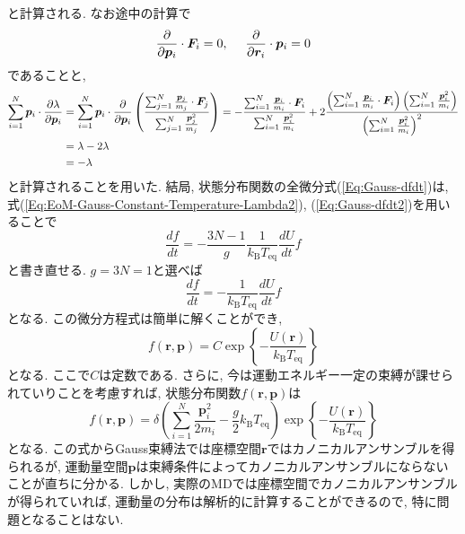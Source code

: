 と計算される. 
なお途中の計算で
\begin{align}
    \frac{\partial}{\partial \bm{p}_{i}} \cdot \bm{F}_{i} = 0,~~~~
    \frac{\partial}{\partial \bm{r}_{i}} \cdot \bm{p}_{i} = 0
    \notag 
\end{align}
であることと, 
\begin{align}
    \sum_{i=1}^{N}
    \bm{p}_{i} \cdot \frac{\partial \lambda}{\partial \bm{p}_{i}}
    &=
    \sum_{i=1}^{N}
    \bm{p}_{i} \cdot \frac{\partial}{\partial \bm{p}_{i}}
    \left(
        \frac
        {\sum_{j=1}^{N} \frac{\bm{p}_{j}}{m_{j}} \cdot \bm{F}_{j}}
        {\sum_{j=1}^{N} \frac{\bm{p}_{j}^{2}}{m_{j}}}
    \right)
    =
    -
    \frac
    {\sum_{i=1}^{N} \frac{\bm{p}_{i}}{m_{i}} \cdot \bm{F}_{i}}
    {\sum_{i=1}^{N} \frac{\bm{p}_{i}^{2}}{m_{i}}}
    +
    2
    \frac
    {
        \left(\sum_{i=1}^{N} \frac{\bm{p}_{i}}{m_{i}} \cdot \bm{F}_{i}\right)
        \left(\sum_{i=1}^{N} \frac{\bm{p}_{i}^{2}}{m_{i}}\right)
    }
    {\left(\sum_{i=1}^{N} \frac{\bm{p}_{i}^{2}}{m_{i}}\right)^{2}}
    \notag \\
    &=
    \lambda - 2 \lambda
    \notag \\
    &=
    - \lambda
    \notag
\end{align}
と計算されることを用いた.
結局, 状態分布関数の全微分式(\ref{Eq:Gauss-dfdt})は, 式(\ref{Eq:EoM-Gauss-Constant-Temperature-Lambda2}), (\ref{Eq:Gauss-dfdt2})を用いることで
\begin{equation}
    \frac{df}{dt}
    =
    -\frac{3N-1}{g}
    \frac{1}{k_{\mathrm{B}}T_{\mathrm{eq}}}
    \frac{dU}{dt} f
\end{equation}
と書き直せる. $g = 3N=1$と選べば
\begin{equation}
    \frac{df}{dt}
    =
    -
    \frac{1}{k_{\mathrm{B}}T_{\mathrm{eq}}}
    \frac{dU}{dt} f
\end{equation}
となる. この微分方程式は簡単に解くことができ,
\begin{equation}
    f(\bm{r}, \bm{p})
    =
    C
    \exp
    \left\{
        - \frac{U(\bm{r})}{k_{\mathrm{B}} T_{\mathrm{eq}}}
    \right\}
\end{equation}
となる. ここで$C$は定数である.
さらに, 今は運動エネルギー一定の束縛が課せられていりことを考慮すれば, 状態分布関数$f(\bm{r}, \bm{p})$は
\begin{equation}
    f(\bm{r}, \bm{p})
    =
    \delta
    \left(
        \sum_{i=1}^{N}
        \frac{\bm{p}_{i}^{2}}{2m_{i}}
        -
        \frac{g}{2} k_{\mathrm{B}}{T_{\mathrm{eq}}}
    \right)
    \exp
    \left\{
        - \frac{U(\bm{r})}{k_{\mathrm{B}} T_{\mathrm{eq}}}
    \right\}
\end{equation}
となる. 
この式からGauss束縛法では座標空間$\bm{r}$ではカノニカルアンサンブルを得られるが, 運動量空間$\bm{p}$は束縛条件によってカノニカルアンサンブルにならないことが直ちに分かる.
しかし, 実際のMDでは座標空間でカノニカルアンサンブルが得られていれば, 運動量の分布は解析的に計算することができるので, 特に問題となることはない.

